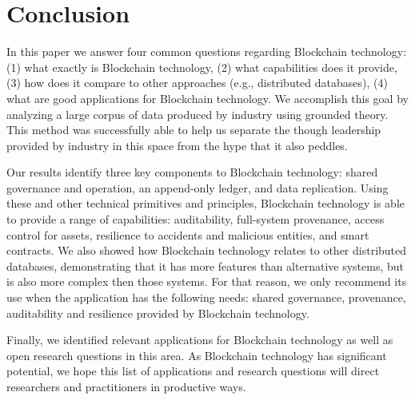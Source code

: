 
\section{Conclusion}
In this paper we answer four common questions regarding Blockchain technology: (1) what exactly is Blockchain technology, (2) what capabilities does it provide, (3) how does it compare to other approaches (e.g., distributed databases), (4) what are good applications for Blockchain technology.
We accomplish this goal by analyzing a large corpus of data produced by industry using grounded theory.
This method was successfully able to help us separate the though leadership provided by industry in this space from the hype that it also peddles.

Our results identify three key components to Blockchain technology: shared governance and operation, an append-only ledger, and data replication.
Using these and other technical primitives and principles, Blockchain technology is able to provide a range of capabilities: auditability, full-system provenance, access control for assets, resilience to accidents and malicious entities, and smart contracts.
We also showed how Blockchain technology relates to other distributed databases, demonstrating that it has more features than alternative systems, but is also more complex then those systems.
For that reason, we only recommend its use when the application has the following needs: shared governance, provenance, auditability and resilience provided by Blockchain technology.

Finally, we identified relevant applications for Blockchain technology as well as open research questions in this area.
As Blockchain technology has significant potential, we hope this list of applications and research questions will direct researchers and practitioners in productive ways.